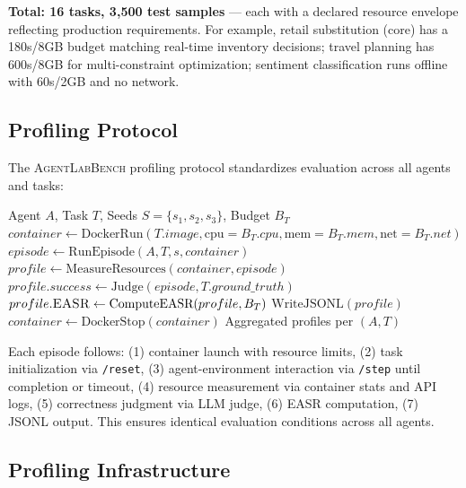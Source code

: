 \documentclass[letterpaper, 10 pt, conference]{ieeeconf}
\newcommand{\agentslabench}{\textsc{AgentLabBench}}
\newcommand{\easr}{\textsc{EASR}}
\begin{document}
\textbf{Total: 16 tasks, 3,500 test samples} --- each with a declared resource envelope reflecting production requirements. For example, retail substitution (core) has a 180s/8GB budget matching real-time inventory decisions; travel planning has 600s/8GB for multi-constraint optimization; sentiment classification runs offline with 60s/2GB and no network.

\subsection{Profiling Protocol}
\label{sec:protocol}

The \agentslabench{} profiling protocol standardizes evaluation across all agents and tasks:

\begin{algorithm}[t]
\caption{\agentslabench{} Profiling Protocol}
\label{alg:protocol}
\begin{algorithmic}[1]
\REQUIRE Agent $A$, Task $T$, Seeds $S = \{s_1, s_2, s_3\}$, Budget $B_T$
    \STATE $container \gets \text{DockerRun}(T.image, \text{cpu}=B_T.cpu, \text{mem}=B_T.mem, \text{net}=B_T.net)$
    \STATE $episode \gets \text{RunEpisode}(A, T, s, container)$
    \STATE $profile \gets \text{MeasureResources}(container, episode)$
    \STATE $profile.success \gets \text{Judge}(episode, T.ground\_truth)$
    \STATE $profile.\easr \gets \text{ComputeEASR}(profile, B_T)$
    \STATE $\text{WriteJSONL}(profile)$
    \STATE $container \gets \text{DockerStop}(container)$
\ENDFOR
\RETURN Aggregated profiles per $(A, T)$
\end{algorithmic}
\end{algorithm}

Each episode follows: (1) container launch with resource limits, (2) task initialization via \texttt{/reset}, (3) agent-environment interaction via \texttt{/step} until completion or timeout, (4) resource measurement via container stats and API logs, (5) correctness judgment via LLM judge, (6) \easr{} computation, (7) JSONL output. This ensures identical evaluation conditions across all agents.

\subsection{Profiling Infrastructure}
\label{sec:infra}
\end{document}
